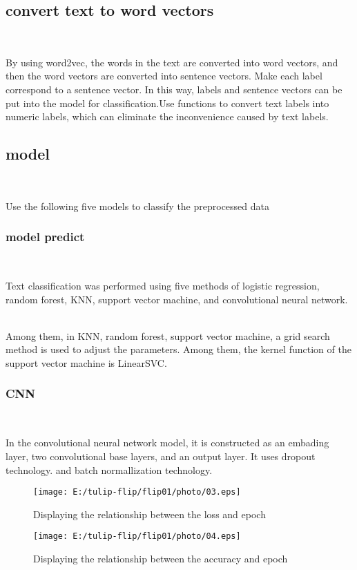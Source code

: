 \subsection{convert text to word vectors}
\ 

By using word2vec, the words in the text are converted into word vectors, 
and then the word vectors are converted into sentence vectors. Make each label correspond 
to a sentence vector. In this way, labels and sentence vectors can be put into the model 
for classification.Use functions to convert text labels into numeric labels, which can eliminate 
the inconvenience caused by text labels.


\subsection{ model}
\

Use the following five models to classify the preprocessed data

\subsubsection{model predict}
\

Text classification was performed using
 five methods of logistic regression, random forest, KNN, 
 support vector machine, and convolutional neural network.
 \

 Among them, in KNN, random forest, support vector machine, a grid search method is used to adjust the parameters.
 Among them, the kernel function of the support vector machine is LinearSVC.
 
 \subsubsection{CNN}
 \

 In the convolutional neural network model, 
 it is constructed as an embading layer, two convolutional base layers, and an output layer. It uses dropout technology. 
 and batch normallization technology.
\
 
\begin{figure}[ht]%
	\centering%
	\texttt{[image: E:/tulip-flip/flip01/photo/03.eps]}
	\caption{Displaying the relationship between the loss and epoch}%
\end{figure} 

\begin{figure}[ht]%
	\centering%
	\texttt{[image: E:/tulip-flip/flip01/photo/04.eps]}
	\caption{Displaying the relationship between the accuracy and epoch}%
\end{figure}
 \

